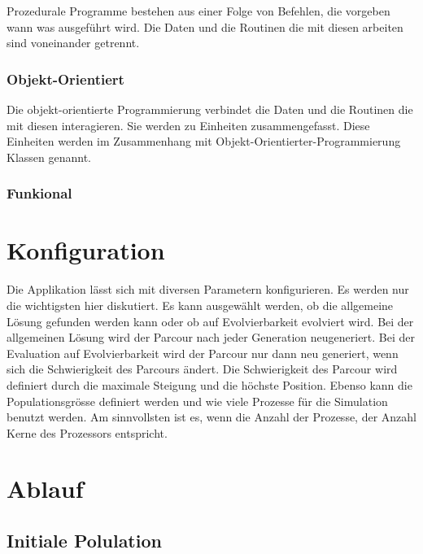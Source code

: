         Prozedurale Programme bestehen aus einer Folge von Befehlen,
        die vorgeben wann was ausgeführt wird.
        Die Daten und die Routinen die mit diesen arbeiten sind voneinander getrennt.

      \subsubsection{Objekt-Orientiert\label{subsub:TechnologyParadigmaObjectOriented}}

        Die objekt-orientierte Programmierung verbindet die Daten und
        die Routinen die mit diesen interagieren. Sie werden zu Einheiten zusammengefasst.
        Diese Einheiten werden im Zusammenhang mit Objekt-Orientierter-Programmierung Klassen genannt.

      \subsubsection{Funkional\label{subsub:TechnologyParadigmaFunctional}}


  \section{Konfiguration}
  \label{sec:Konfiguration}
    Die Applikation lässt sich mit diversen Parametern konfigurieren.
    Es werden nur die wichtigsten hier diskutiert.
    Es kann ausgewählt werden, ob die allgemeine Lösung gefunden werden kann oder
    ob auf Evolvierbarkeit evolviert wird. Bei der allgemeinen Lösung wird der Parcour
    nach jeder Generation neugeneriert. Bei der Evaluation auf Evolvierbarkeit
    wird der Parcour nur dann neu generiert, wenn sich die Schwierigkeit des Parcours ändert.
    Die Schwierigkeit des Parcour wird definiert durch die maximale Steigung und die höchste Position.
    Ebenso kann die Populationsgrösse definiert werden und wie viele Prozesse für die Simulation benutzt werden.
    Am sinnvollsten ist es, wenn die Anzahl der Prozesse, der Anzahl Kerne des Prozessors entspricht.




  \section{Ablauf\label{sec:Ablauf}}

    \subsection{Initiale Polulation\label{sec:Initiale Polulation}}

